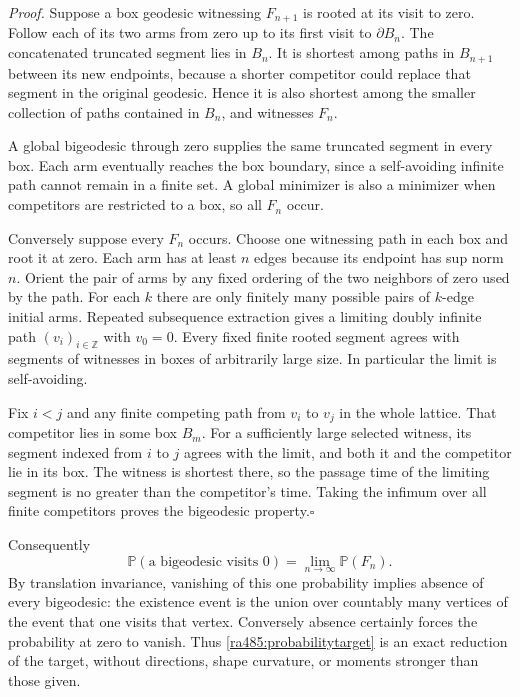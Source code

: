 \documentclass[11pt]{article}
\begin{document}
\emph{Proof.}
Suppose a box geodesic witnessing $F_{n+1}$ is rooted at its visit to
zero. Follow each of its two arms from zero up to its first visit to
$\partial B_n$. The concatenated truncated segment lies in $B_n$.
It is shortest among paths in $B_{n+1}$ between its new endpoints,
because a shorter competitor could replace that segment in the original
geodesic. Hence it is also shortest among the smaller collection of
paths contained in $B_n$, and witnesses $F_n$.

A global bigeodesic through zero supplies the same truncated segment in
every box. Each arm eventually reaches the box boundary, since a
self-avoiding infinite path cannot remain in a finite set. A global
minimizer is also a minimizer when competitors are restricted to a box,
so all $F_n$ occur.

Conversely suppose every $F_n$ occurs. Choose one witnessing path in
each box and root it at zero. Each arm has at least $n$ edges because
its endpoint has sup norm $n$. Orient the pair of arms by any fixed
ordering of the two neighbors of zero used by the path. For each $k$
there are only finitely many possible pairs of $k$-edge initial arms.
Repeated subsequence extraction gives a limiting doubly infinite path
$(v_i)_{i\in\mathbb Z}$ with $v_0=0$. Every fixed finite rooted
segment agrees with segments of witnesses in boxes of arbitrarily
large size. In particular the limit is self-avoiding.

Fix $i<j$ and any finite competing path from $v_i$ to $v_j$ in the
whole lattice. That competitor lies in some box $B_m$. For a sufficiently
large selected witness, its segment indexed from $i$ to $j$ agrees with
the limit, and both it and the competitor lie in its box. The witness
is shortest there, so the passage time of the limiting segment is no
greater than the competitor's time. Taking the infimum over all finite
competitors proves the bigeodesic property.\hfill$\square$

Consequently
\begin{equation}\label{ra485:probabilitytarget}
 \mathbb P(\text{a bigeodesic visits }0)
                  =\lim_{n\to\infty}\mathbb P(F_n).
\end{equation}
By translation invariance, vanishing of this one probability implies
absence of every bigeodesic: the existence event is the union over
countably many vertices of the event that one visits that vertex.
Conversely absence certainly forces the probability at zero to vanish.
Thus \eqref{ra485:probabilitytarget} is an exact reduction of the target,
without directions, shape curvature, or moments stronger than those given.
\end{document}
